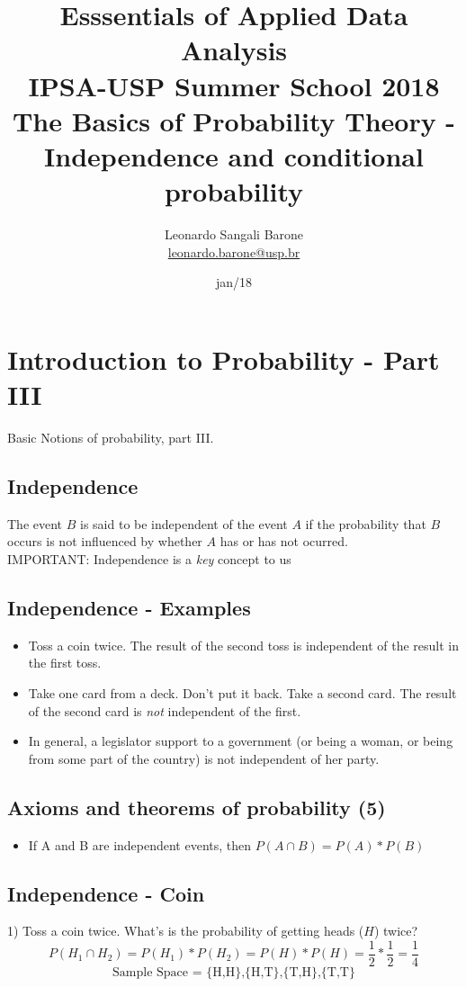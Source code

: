 \documentclass[11pt]{article}
\title{\textbf{Esssentials of Applied Data Analysis\\
				IPSA-USP Summer School 2018}\newline\\
				The Basics of Probability Theory - Independence and conditional probability}
\author{Leonardo Sangali Barone\\ \href{leonardo.barone@usp.br}{leonardo.barone@usp.br}}
\date{jan/18}
\begin{document}
\maketitle

\section*{Introduction to Probability - Part III}

	Basic Notions of probability, part III.

	\subsection*{Independence}
	The event $B$ is said to be independent of the event $A$ if the probability that $B$ occurs is not influenced by whether $A$ has or has not ocurred.\\

	IMPORTANT: Independence is a \emph{key} concept to us	

	\subsection*{Independence - Examples}
	\begin{itemize}
		\item Toss a coin twice. The result of the second toss is independent of the result in the first toss. 
		\item Take one card from a deck. Don't put it back. Take a second card. The result of the second card is \emph{not} independent of the first.
		\item In general, a legislator support to a government (or being a woman, or being from some part of the country) is not independent of her party.		
	\end{itemize}	


	\subsection*{Axioms and theorems of probability (5)}
	\begin{itemize}
		\item If A and B are independent events, then $P(A \cap B) = P(A) * P(B)$
	\end{itemize}


	\subsection*{Independence - Coin}
	1) Toss a coin twice.
	What's is the probability of getting heads ($H$) twice?
	\[P(H_1\cap H_2) = P(H_1) * P(H_2) = P(H) * P(H) =\frac{1}{2} * \frac{1}{2} = \frac{1}{4}\]
	\[\text{Sample Space = \{H,H\},\{H,T\},\{T,H\},\{T,T\}}\]
	
\end{document}
